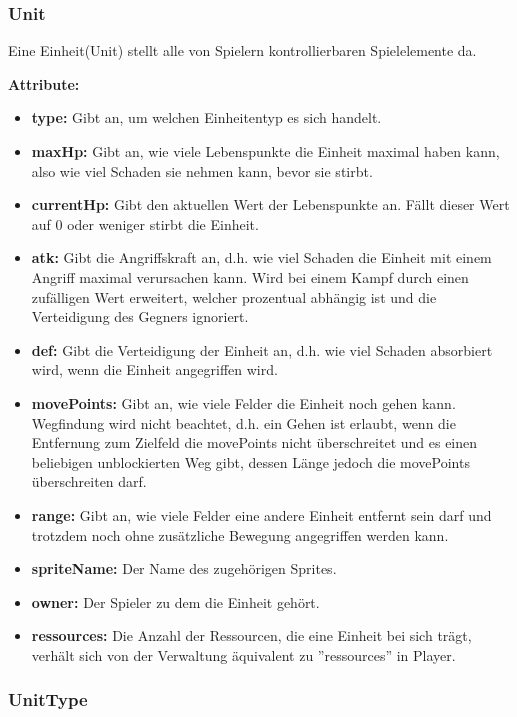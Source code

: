 \documentclass[fontsize=12pt,paper=a4,twoside]{scrartcl}
\begin{document}
\subsubsection{Unit}

Eine Einheit(Unit) stellt alle von Spielern kontrollierbaren Spielelemente da.

\textbf{Attribute:}
\begin{itemize}
\item \textbf{type:} Gibt an, um welchen Einheitentyp es sich handelt.
\item \textbf{maxHp:} Gibt an, wie viele Lebenspunkte die Einheit maximal haben kann, also wie viel Schaden sie nehmen kann, bevor sie stirbt.
\item \textbf{currentHp:} Gibt den aktuellen Wert der Lebenspunkte an. Fällt dieser Wert auf 0 oder weniger stirbt die Einheit.
\item \textbf{atk:} Gibt die Angriffskraft an, d.h. wie viel Schaden die Einheit mit einem Angriff maximal verursachen kann. Wird bei einem Kampf durch einen zufälligen Wert erweitert, welcher prozentual abhängig ist und die Verteidigung des Gegners ignoriert.
\item \textbf{def:} Gibt die Verteidigung der Einheit an, d.h. wie viel Schaden absorbiert wird, wenn die Einheit angegriffen wird.
\item \textbf{movePoints:} Gibt an, wie viele Felder die Einheit noch gehen kann. Wegfindung wird nicht beachtet, d.h. ein Gehen ist erlaubt, wenn die Entfernung zum Zielfeld die movePoints nicht überschreitet und es einen beliebigen unblockierten Weg gibt, dessen Länge jedoch die movePoints überschreiten darf.
\item \textbf{range:} Gibt an, wie viele Felder eine andere Einheit entfernt sein darf und trotzdem noch ohne zusätzliche Bewegung angegriffen werden kann.
\item \textbf{spriteName:} Der Name des zugehörigen Sprites.
\item \textbf{owner:} Der Spieler zu dem die Einheit gehört.
\item \textbf{ressources:} Die Anzahl der Ressourcen, die eine Einheit bei sich trägt, verhält sich von der Verwaltung äquivalent zu ''ressources'' in Player.
\end{itemize}


\subsubsection{UnitType}
\end{document}
